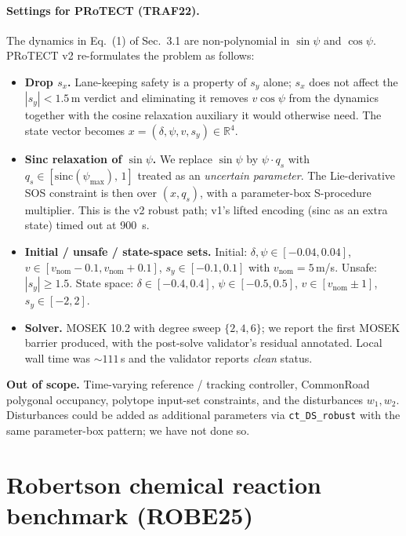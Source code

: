 \documentclass[11pt,a4paper]{article}
\newcommand{\settings}[1]{\paragraph{Settings for PRoTECT (#1).}}
\begin{document}
\settings{TRAF22}
The dynamics in Eq.~(1) of Sec.~3.1 are non-polynomial in
$\sin\psi$ and $\cos\psi$. PRoTECT v2 re-formulates the problem as
follows:
\begin{itemize}
  \item \textbf{Drop $s_x$.} Lane-keeping safety is a property of $s_y$
        alone; $s_x$ does not affect the $|s_y| < 1.5\,$m verdict and
        eliminating it removes $v\cos\psi$ from the dynamics together
        with the cosine relaxation auxiliary it would otherwise need.
        The state vector becomes $x = (\delta, \psi, v, s_y) \in \mathbb{R}^4$.
  \item \textbf{Sinc relaxation of $\sin\psi$.} We replace $\sin\psi$ by
        $\psi \cdot q_s$ with $q_s \in [\mathrm{sinc}(\psi_{\max}),\, 1]$
        treated as an \emph{uncertain parameter}. The Lie-derivative SOS
        constraint is then over $(x, q_s)$, with a parameter-box
        S-procedure multiplier. This is the v2 robust path; v1's lifted
        encoding (sinc as an extra state) timed out at 900~s.
  \item \textbf{Initial / unsafe / state-space sets.} Initial:
        $\delta, \psi \in [-0.04, 0.04]$, $v \in [v_{\mathrm{nom}}-0.1,
        v_{\mathrm{nom}}+0.1]$, $s_y \in [-0.1, 0.1]$ with
        $v_{\mathrm{nom}} = 5\,$m/s. Unsafe: $|s_y| \ge 1.5$. State space:
        $\delta \in [-0.4, 0.4]$, $\psi \in [-0.5, 0.5]$,
        $v \in [v_{\mathrm{nom}} \pm 1]$, $s_y \in [-2, 2]$.
  \item \textbf{Solver.} MOSEK 10.2 with degree sweep $\{2, 4, 6\}$;
        we report the first MOSEK barrier produced, with the post-solve
        validator's residual annotated. Local wall time was ${\sim}111\,$s
        and the validator reports \emph{clean} status.
\end{itemize}
\textbf{Out of scope.} Time-varying reference / tracking controller,
CommonRoad polygonal occupancy, polytope input-set constraints, and the
disturbances $w_1, w_2$. Disturbances could be added as additional
parameters via \texttt{ct\_DS\_robust} with the same parameter-box
pattern; we have not done so.

\section{Robertson chemical reaction benchmark (ROBE25)}
\end{document}
